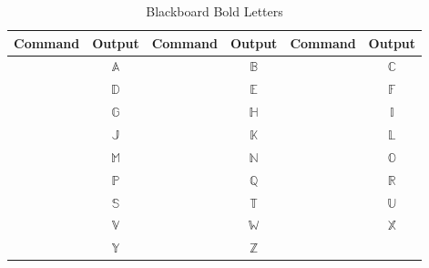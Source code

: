 \begin{table}[htbp]
	\centering
	\caption{Blackboard Bold Letters}
	\label{tab:bb_letters}
	\begin{tabularx}{\linewidth}{CcCcCc}
		\toprule
			\textbf{Command}     & \textbf{Output} & \textbf{Command}     & \textbf{Output} & \textbf{Command}     & \textbf{Output} \\
		\midrule
			 & \(\mathbb{A}\)  &  & \(\mathbb{B}\)  &  & \(\mathbb{C}\)  \\
			 & \(\mathbb{D}\)  &  & \(\mathbb{E}\)  &  & \(\mathbb{F}\)  \\
			 & \(\mathbb{G}\)  &  & \(\mathbb{H}\)  &  & \(\mathbb{I}\)  \\
			 & \(\mathbb{J}\)  &  & \(\mathbb{K}\)  &  & \(\mathbb{L}\)  \\
			 & \(\mathbb{M}\)  &  & \(\mathbb{N}\)  &  & \(\mathbb{O}\)  \\
			 & \(\mathbb{P}\)  &  & \(\mathbb{Q}\)  &  & \(\mathbb{R}\)  \\
			 & \(\mathbb{S}\)  &  & \(\mathbb{T}\)  &  & \(\mathbb{U}\)  \\
			 & \(\mathbb{V}\)  &  & \(\mathbb{W}\)  &  & \(\mathbb{X}\)  \\
			 & \(\mathbb{Y}\)  &  & \(\mathbb{Z}\)  &                      &                 \\
		\bottomrule
	\end{tabularx}
\end{table}

